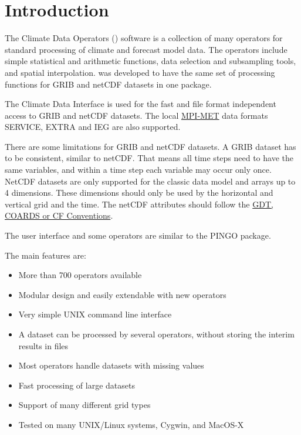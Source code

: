 \chapter{Introduction}

The Climate Data Operators ({\CDO}) software is a collection of many operators
for standard processing of climate and forecast model data.
The operators include simple statistical and arithmetic functions, data selection
and subsampling tools, and spatial interpolation.
{\CDO} was developed to have the same set of processing functions for GRIB \cite{GRIB} and netCDF \cite{netCDF}
datasets in one package.

The Climate Data Interface \cite{CDI} is used for the fast and file format
independent access to GRIB and netCDF datasets.
The local \href{http://www.mpimet.mpg.de/}{MPI-MET} data formats SERVICE, EXTRA and 
IEG are also supported.

There are some limitations for GRIB and netCDF datasets.
A GRIB dataset has to be consistent, similar to netCDF.
That means all time steps need to have the same variables, and
within a time step each variable may occur only once.
NetCDF datasets are only supported for the classic data model and arrays up to 4 dimensions.
These dimensions should only be used by the horizontal and vertical grid and the time.
The netCDF attributes should follow the
\href{http://ftp.unidata.ucar.edu/software/netcdf/docs/conventions.html}
     {GDT, COARDS or CF Conventions}.

The user interface and some operators are similar to the PINGO \cite{PINGO} package.

The main {\CDO} features are:
\begin{itemize}
\item More than 700 operators available
\item Modular design and easily extendable with new operators
\item Very simple UNIX command line interface
\item A dataset can be processed by several operators,
      without storing the interim results in files %
\item Most operators handle datasets with missing values
\item Fast processing of large datasets
\item Support of many different grid types
\item Tested on many UNIX/Linux systems, Cygwin, and MacOS-X
\end{itemize}














